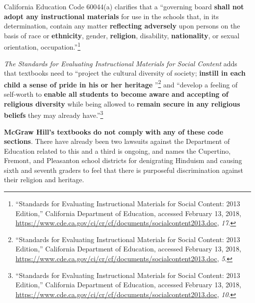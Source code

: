 California Education Code 60044(a) clarifies that a “governing board \textbf{shall not adopt any instructional materials} for use in the schools that, in its determination, contain any matter \textbf{reflecting adversely} upon persons on the basis of race or \textbf{ethnicity}, gender, \textbf{religion}, disability, \textbf{nationality}, or sexual orientation, occupation.”\footnote{“Standards for Evaluating Instructional Materials for Social Content: 2013 Edition,” California Department of Education, accessed February 13, 2018, \url{https://www.cde.ca.gov/ci/cr/cf/documents/socialcontent2013.doc}, \textit{17}.}

\textit{The Standards for Evaluating Instructional Materials for Social Content} adds that textbooks need to “project the cultural diversity of society; \textbf{instill in each child a sense of pride in his or her heritage} ”\footnote{“Standards for Evaluating Instructional Materials for Social Content: 2013 Edition,” California Department of Education, accessed February 13, 2018, \url{https://www.cde.ca.gov/ci/cr/cf/documents/socialcontent2013.doc}, \textit{5}.} and “develop a feeling of self-worth to \textbf{enable all students to become aware and accepting of religious diversity} while being allowed to \textbf{remain secure in any religious beliefs} they may already have.”\footnote{“Standards for Evaluating Instructional Materials for Social Content: 2013 Edition,” California Department of Education, accessed February 13, 2018, \url{https://www.cde.ca.gov/ci/cr/cf/documents/socialcontent2013.doc}, \textit{10}.}

\textbf{McGraw Hill’s textbooks} \textbf{do not comply} \textbf{with any of these code sections}. There have already been two lawsuits against the Department of Education related to this and a third is ongoing, and names the Cupertino, Fremont, and Pleasanton school districts for denigrating Hinduism and causing sixth and seventh graders to feel that there is purposeful discrimination against their religion and heritage.

